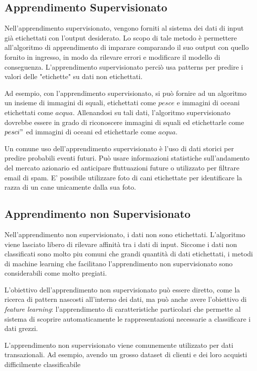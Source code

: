 \subsection{Apprendimento Supervisionato}
Nell'apprendimento supervisionato, vengono forniti al sistema dei dati di input già etichettati con l'output desiderato. Lo scopo di tale metodo è permettere all'algoritmo di apprendimento di imparare comparando il suo output con quello fornito in ingresso, in modo da rilevare errori e modificare il modello di conseguenza. L'apprendimento supervisionato perciò usa patterns per predire i valori delle "etichette" su dati non etichettati.

Ad esempio, con l'apprendimento supervisionato, si può fornire ad un algoritmo un insieme di immagini di squali, etichettati come $pesce$ e immagini di oceani etichettati come $acqua$. Allenandosi su tali dati, l'algoritmo supervisionato dovrebbe essere in grado di riconoscere immagini di squali ed etichettarle come $pesci"$ ed immagini di oceani ed etichettarle come $acqua$.

Un comune uso dell'apprendimento supervisionato è l'uso di dati storici per predire probabili eventi futuri. Può usare informazioni statistiche sull'andamento del mercato azionario ed anticipare fluttuazioni future o utilizzato per filtrare email di spam. E' possibile utilizzare foto di cani etichettate per identificare la razza di un cane unicamente dalla sua foto.

\subsection{Apprendimento non Supervisionato}
Nell'apprendimento non supervisionato, i dati non sono etichettati. L'algoritmo viene lasciato libero di rilevare affinità tra i dati di input. Siccome i dati non classificati sono molto piu comuni che grandi quantità di dati etichettati, i metodi di machine learning che facilitano l'apprendimento non supervisionato sono considerabili come molto pregiati.

L'obiettivo dell'apprendimento non supervisionato può essere diretto, come la ricerca di pattern nascosti all'interno dei dati, ma può anche avere l'obiettivo di \textit{feature learning}: l'apprendimento di caratteristiche particolari che permette al sistema di scoprire automaticamente le rappresentazioni necessarie a classificare i dati grezzi.

L'apprendimento non supervisionato viene comunemente utilizzato per dati transazionali. Ad esempio, avendo un grosso dataset di clienti e dei loro acquisti difficilmente classificabile 

